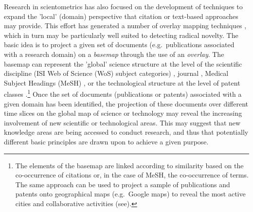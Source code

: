 \documentclass[11pt]{article}
\begin{document}
Research in scientometrics has also focused on the development of techniques to expand the 'local' (domain) perspective that citation or text-based approaches may provide. This effort has generated a number of overlay mapping techniques \citep[for an overview see][]{Rotolo2014c}, which in turn may be particularly well suited to detecting radical novelty. The basic idea is to project a given set of documents (e.g.\ publications associated with a research domain) on a \textit{basemap} through the use of an \textit{overlay}. The basemap can represent the 'global' science structure at the level of the scientific discipline (ISI Web of Science (WoS) subject categories) \citep[e.g.][]{Rafols2010}, journal \citep[e.g.][]{Leydesdorff2013j}, Medical Subject Headings (MeSH)  \citep{Leydesdorff2012}, or the technological structure at the level of patent classes \citep[e.g.][]{Kay2014,Leydesdorff2014}.\footnote{The elements of the basemap are linked according to similarity based on the co-occurrence of citations or, in the case of MeSH, the co-occurrence of terms. The same approach can be used to project a sample of publications and patents onto geographical maps (e.g.\ Google maps) to reveal the most active cities and collaborative activities (see).}  Once the set of documents (publications or patents) associated with a given domain has been identified, the projection of these documents over different time slices on the global map of science or technology may reveal the increasing involvement of new scientific or technological areas. This may suggest that new knowledge areas are being accessed to conduct research, and thus that potentially different basic principles are drawn upon to achieve a given purpose.
\end{document}
